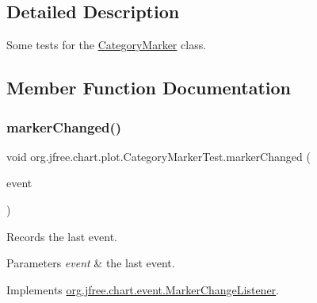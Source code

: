 \subsection{Detailed Description}
Some tests for the \mbox{\hyperlink{classorg_1_1jfree_1_1chart_1_1plot_1_1_category_marker}{Category\+Marker}} class. 

\subsection{Member Function Documentation}
\mbox{\label{classorg_1_1jfree_1_1chart_1_1plot_1_1_category_marker_test_aa5b6c0ae6a4ff14acf794812d66db245}} 
\subsubsection{\texorpdfstring{marker\+Changed()}{markerChanged()}}
{\footnotesize\ttfamily void org.\+jfree.\+chart.\+plot.\+Category\+Marker\+Test.\+marker\+Changed (\begin{DoxyParamCaption}\item[{\mbox{\hyperlink{classorg_1_1jfree_1_1chart_1_1event_1_1_marker_change_event}{Marker\+Change\+Event}}}]{event }\end{DoxyParamCaption})}

Records the last event.


\begin{DoxyParams}{Parameters}
{\em event} & the last event. \\
\hline
\end{DoxyParams}


Implements \mbox{\hyperlink{interfaceorg_1_1jfree_1_1chart_1_1event_1_1_marker_change_listener_a0797552ac12ca77a9ddd96cfe5abb60e}{org.\+jfree.\+chart.\+event.\+Marker\+Change\+Listener}}.

\mbox{\label{classorg_1_1jfree_1_1chart_1_1plot_1_1_category_marker_test_ad0413841f58a194616ce4d451ea38a32}} 
